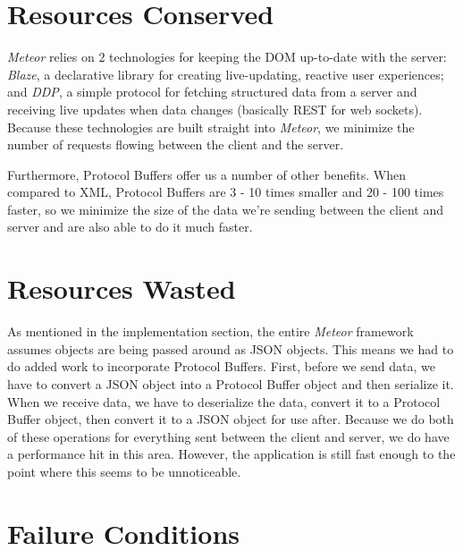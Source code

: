 \documentclass[11pt]{article} %
\begin{document}
\section{Resources Conserved}

\textit{Meteor} relies on 2 technologies for keeping the DOM up-to-date with the server: \textit{Blaze}, a declarative library for creating live-updating, reactive user experiences; and \textit{DDP}, a simple protocol for fetching structured data from a server and receiving live updates when data changes (basically REST for web sockets). Because these technologies are built straight into \textit{Meteor}, we minimize the number of requests flowing between the client and the server.

Furthermore, Protocol Buffers offer us a number of other benefits. When compared to XML, Protocol Buffers are 3 - 10 times smaller and 20 - 100 times faster, so we minimize the size of the data we're sending between the client and server and are also able to do it much faster.

\section{Resources Wasted}

As mentioned in the implementation section, the entire \textit{Meteor} framework assumes objects are being passed around as JSON objects. This means we had to do added work to incorporate Protocol Buffers. First, before we send data, we have to convert a JSON object into a Protocol Buffer object and then serialize it. When we receive data, we have to deserialize the data, convert it to a Protocol Buffer object, then convert it to a JSON object for use after. Because we do both of these operations for everything sent between the client and server, we do have a performance hit in this area. However, the application is still fast enough to the point where this seems to be unnoticeable.

\section{Failure Conditions}
\end{document}
